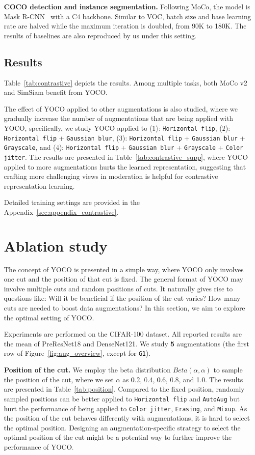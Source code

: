 \documentclass{article}
\begin{document}
\textbf{COCO detection and instance segmentation.}
Following MoCo, the model is Mask R-CNN~\cite{he2017mask} with a C4 backbone. Similar to VOC, batch size and base learning rate are halved while the maximum iteration is doubled, from 90K to 180K. The results of baselines are also reproduced by us under this setting. 

\subsection{Results}
Table~\ref{tab:contrastive} depicts the results. Among multiple tasks, both MoCo v2 and SimSiam benefit from YOCO. 


The effect of YOCO applied to other augmentations is also studied, where we gradually increase the number of augmentations that are being applied with YOCO, specifically, we study YOCO applied to (1): \texttt{Horizontal flip}, (2): \texttt{Horizontal flip} +  \texttt{Gaussian blur}, (3): \texttt{Horizontal flip} + \texttt{Gaussian blur} + \texttt{Grayscale}, and (4): \texttt{Horizontal flip} + \texttt{Gaussian blur} + \texttt{Grayscale} + \texttt{Color jitter}. The results are presented in Table~\ref{tab:contrastive_supp}, where YOCO applied to more augmentations hurts the learned representation, suggesting that crafting more challenging views in moderation is helpful for contrastive representation learning.

Detailed training settings are provided in the Appendix~\ref{sec:appendix_contrastive}.

\section{Ablation study}
The concept of YOCO is presented in a simple way, where YOCO only involves one cut and the position of that cut is fixed. The general format of YOCO may involve multiple cuts and random positions of cuts. It naturally gives rise to questions like: Will it be beneficial if the position of the cut varies? How many cuts are needed to boost data augmentations? In this section, we aim to explore the optimal setting of YOCO. 

Experiments are performed on the CIFAR-100 dataset. All reported results are the mean of PreResNet18 and DenseNet121. We study \textbf{5} augmentations (the first row of Figure~\ref{fig:aug_overview}, except for \texttt{G1}). 

\textbf{Position of the cut.}
We employ the beta distribution $Beta(\alpha, \alpha)$ to sample the position of the cut, where we set $\alpha$ as 0.2, 0.4, 0.6, 0.8, and 1.0. The results are presented in Table~\ref{tab:position}. Compared to the fixed position, randomly sampled positions can be better applied to \texttt{Horizontal flip} and \texttt{AutoAug} but hurt the performance of being applied to \texttt{Color jitter}, \texttt{Erasing}, and \texttt{Mixup}. As the position of the cut behaves differently with augmentations, it is hard to select the optimal position. Designing an augmentation-specific strategy to select the optimal position of the cut might be a potential way to further improve the performance of YOCO.
\end{document}

